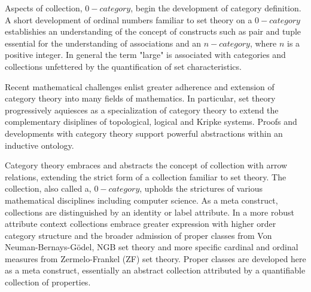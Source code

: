 \documentclass[aps,twocolumn,secnumarabic,nobalancelastpage,amsmath,amssymb,
amsthm,nofootinbib,parskip=full]{revtex4}
\numberwithin{equation}{section}
\begin{document}
Aspects of collection, $0-category$, begin the development of
category definition. A short development of ordinal numbers
familiar to set theory on a $0-category$ establishies an understanding
of the concept of constructs such as pair and tuple essential for
the understanding of associations and an $n-category$,
where $n$ is a positive integer. In general the term "large" is associated
with categories and collections unfettered by the quantification of set
characteristics.

Recent mathematical challenges enlist greater adherence and extension of
category theory into many fields of mathematics.
In particular, set theory progressively aquiesces as a specialization of
category theory to extend the complementary disiplines of topological,
logical and Kripke systems.
Proofs and developments with category theory support
powerful abstractions within an inductive ontology.

Category theory embraces and abstracts the concept of
collection with arrow relations, extending the strict form of a
collection familiar to set theory.
The collection, also called a, $0-category$, upholds the strictures of
various mathematical disciplines including computer science.
As a meta construct, collections are distinguished
by an identity or label attribute. In a more robust attribute
context collections embrace greater expression
with higher order category structure and the broader admission of
proper classes from Von Neuman-Bernays-G\"{o}del, NGB set theory
and more specific cardinal and ordinal measures from
Zermelo-Frankel (ZF) set theory. Proper classes are developed
here as a meta construct, essentially an abstract collection
attributed by a quantifiable collection of properties.
\end{document}
